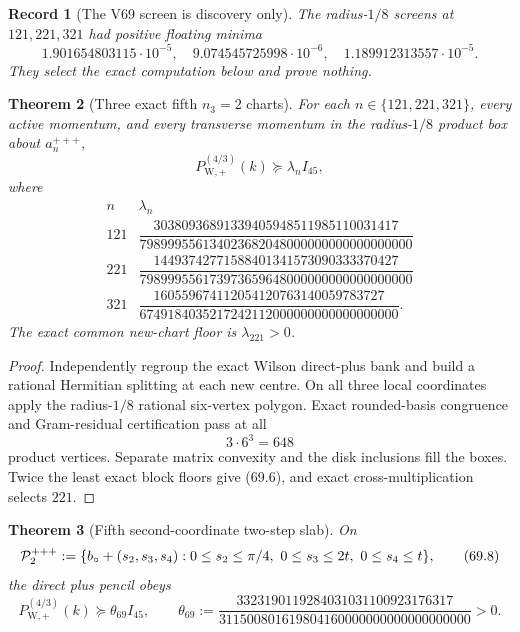 \documentclass[11pt,oneside]{article}
\newtheorem{theorem}{Theorem}[section]
\newtheorem{record}[theorem]{Record}
\theoremstyle{definition}
\theoremstyle{remark}
\begin{document}
\begin{record}[The V69 screen is discovery only]
\label{rec:newv69-screen}
The radius-\(1/8\) screens at \(121,221,321\) had positive floating
minima
\[
 1.901654803115\cdot10^{-5},\quad
 9.074545725998\cdot10^{-6},\quad
 1.189912313557\cdot10^{-5}.                          \tag{69.4}
\]
They select the exact computation below and prove nothing.
\end{record}

\begin{theorem}[Three exact fifth \(n_3=2\) charts]
\label{thm:newv69-three-charts}
For each \(n\in\{121,221,321\}\), every active momentum, and every
transverse momentum in the radius-\(1/8\) product box about
\(a_n^{+++}\),
\[
 P_{\mathrm W,+}^{(4/3)}(k)\succeq\lambda_nI_{45},   \tag{69.5}
\]
where
\[
\begin{array}{c|c}
n&\lambda_n\\ \hline
121&
\dfrac{30380936891339405948511985110031417}
 {798999556134023682048000000000000000000}\\[6pt]
221&
\dfrac{14493742771588401341573090333370427}
 {798999556173973659648000000000000000000}\\[6pt]
321&
\dfrac{160559674112054120763140059783727}
 {6749184035217242112000000000000000000}.
\end{array}                                           \tag{69.6}
\]
The exact common new-chart floor is \(\lambda_{221}>0\).
\end{theorem}

\begin{proof}
Independently regroup the exact Wilson direct-plus bank and build a
rational Hermitian splitting at each new centre.  On all three
local coordinates apply the radius-\(1/8\) rational six-vertex
polygon.  Exact rounded-basis congruence and Gram-residual
certification pass at all
\[
 3\cdot6^3=648                                        \tag{69.7}
\]
product vertices.  Separate matrix convexity and the disk
inclusions fill the boxes.  Twice the least exact block floors give
(69.6), and exact cross-multiplication selects \(221\).
\end{proof}

\begin{theorem}[Fifth second-coordinate two-step slab]
\label{thm:newv69-second-slab}
On
\[
 {\cal P}^{+++}_2:=
 \{b_\circ+(s_2,s_3,s_4):
 0\le s_2\le\pi/4,\ 0\le s_3\le2t,\ 0\le s_4\le t\}, \tag{69.8}
\]
the direct plus pencil obeys
\[
 P_{\mathrm W,+}^{(4/3)}(k)
 \succeq\theta_{69}I_{45},\qquad
 \theta_{69}:=
 \frac{3323190119284031031100923176317}
 {311500801619804160000000000000000000}>0.           \tag{69.9}
\]
\end{theorem}
\end{document}
